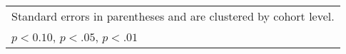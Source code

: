 \begin{table}[htbp]
\begin{adjustbox}{max width=1\textwidth}
\begin{tabular}{l*{6}{c}}
				\hline\hline
				\multicolumn{7}{l}{\footnotesize Standard errors in parentheses and are clustered by cohort level.}\\
				\multicolumn{7}{l}{\footnotesize \sym{*} \(p<0.10\), \sym{**} \(p<.05\), \sym{***} \(p<.01\)}\\
			\end{tabular}%
		\end{adjustbox}

	\end{table}